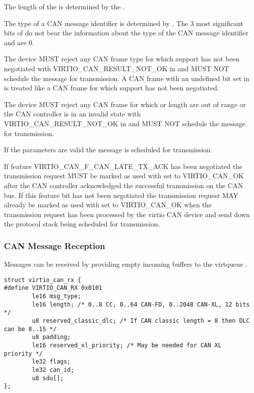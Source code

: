 The length of the  is determined by the .

The type of a CAN message identifier is determined by . The
3 most significant bits of  do not bear the information
about the type of the CAN message identifier and are 0.

The device MUST reject any CAN frame type for which support has not been
negotiated with VIRTIO_CAN_RESULT_NOT_OK in  and MUST NOT
schedule the message for transmission. A CAN frame with an undefined bit
set in  is treated like a CAN frame for which support has
not been negotiated.

The device MUST reject any CAN frame for which  or
 length are out of range or the CAN controller is in an
invalid state with VIRTIO_CAN_RESULT_NOT_OK in  and MUST
NOT schedule the message for transmission.

If the parameters are valid the message is scheduled for transmission.

If feature VIRTIO_CAN_F_CAN_LATE_TX_ACK has been negotiated the
transmission request MUST be marked as used with  set to
VIRTIO_CAN_OK after the CAN controller acknowledged the successful
transmission on the CAN bus. If this feature bit has not been negotiated
the transmission request MAY already be marked as used with
 set to VIRTIO_CAN_OK when the transmission request has
been processed by the virtio CAN device and send down the protocol stack
being scheduled for transmission.

\subsubsection{CAN Message Reception}\label{sec:Device Types / CAN Device / Device Operation / CAN Message Reception}

Messages can be received by providing empty incoming buffers to the
virtqueue .

\label{struct virtio-can-rx}
\begin{lstlisting}
struct virtio_can_rx {
#define VIRTIO_CAN_RX 0x0101
        le16 msg_type;
        le16 length; /* 0..8 CC, 0..64 CAN-FD, 0..2048 CAN-XL, 12 bits */
        u8 reserved_classic_dlc; /* If CAN classic length = 8 then DLC can be 8..15 */
        u8 padding;
        le16 reserved_xl_priority; /* May be needed for CAN XL priority */
        le32 flags;
        le32 can_id;
        u8 sdu[];
};
\end{lstlisting}

